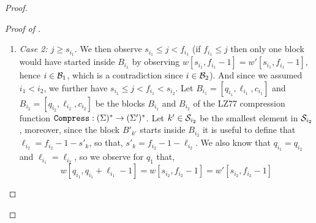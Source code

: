 \begin{proof}
\begin{proof}[Proof of ]
\begin{enumerate}
\[w[q_{i_1},q_{i_1}+\ell_{i_1}-1]=w[s_{i_1},f_{i_1}-1]=w'[s_{i_1},f_{i_1}-1],\]
and
\[w[q_{i_2},q_{i_2}+\ell_{i_2}-1]=w[s_{i_2},f_{i_2}-1]=w'[s_{i_2},f_{i_2}-1],\]

Therefore, we have that,
\[w'[s'_{k},f_{i_2}-1]=w'[s_{i_1}+(s'_{k}-s_{i_2}),f_{i_1}-1].\]

By definition of LZ77 we know that, $f'_k\geq f_{i_2}.$ Now, suppose for contradiction that $f'_k<f_{i_2}$, then $w'[s'_k,f'_{k}-1]$ is the longest substring of $w'$ starting at $s'_k$, but, $w'[s'_k,f_{i_2}-1]=w'[s_{i_1}+(s'_k-s_{i_2}),f_{i_1}-1]$
implies that $w'[s'_k,f_{i_2}-1]$ is a substring of $w'$ but $f_{i_2}-1>f'_k-1$ that is a contradiction!. Then $f'_k \geq f_{i_2}$.
    



Finally, if there is another $k' \in \S_{i_2}$ such that $k' \neq k$ then, by choice of $k$, we have $k<k'$ and therefore $s_{k'}' > f_k' \geq f_{i_2}$. This contradicts the definition of $\S_{i_2}$ since block $B_k'$ does not start inside block $B_{i_2}$. It follows that $\left| \S_{i_2}\right| \leq 1$ and therefore $i_2\in\B_1$. This is a contradiction!. Hence, we can conclude that if $i_1,i_2\in\B_2$ then $(q_{i_1},\ell_{i_1})\neq(q_{i_2},\ell_{i_2})$.

\label{case:length_cases_total:case:b}  \item \emph{Case 2: $j \geq s_{i_1}$}.
We then observe $s_{i_1} \leq j<f_{i_1}$ (if $f_{i_1}\leq j$ then only one block would have started inside $B_{i_1}$ by observing $w[s_{i_1},f_{i_1}-1]=w'[s_{i_1},f_{i_1}-1]$, hence $i\in {\ensuremath{\mathcal{B}}}_1$, which is a contradiction since $i\in{\ensuremath{\mathcal{B}}}_2$). And since we assumed $i_1<i_2$, we further have $s_{i_1} \leq j<f_{i_1}<s_{i_2}$. Let $B_{i_1}=[q_{i_1},\ell_{i_1},c_{i_1}]$ and $B_{i_2}=[q_{i_2},\ell_{i_2},c_{i_2}]$ be  the blocks $B_{i_1}$ and $B_{i_2}$ of the LZ77 compression function $\mathtt{Compress}:(\Sigma)^*\rightarrow(\Sigma')^*$. Let $k' \in \S_{i_2}$ be the smallest element in  $\S_{i_2}$, moreover, since the block $B'_{k'}$ starts inside $B_{i_2}$ it is useful to define that $\ell_{i_2}=f_{i_2}-1-s'_k$, so that, $s'_k=f_{i_2}-1-\ell_{i_2}$. We also know that $q_{i_1}=q_{i_2}$ and $\ell_{i_1}=\ell_{i_2}$, so we observe for $q_1$ that, 
\[w[q_{i_1},q_{i_1}+\ell_{i_1}-1]=w[s_{i_2},f_{i_2}-1]=w'[s_{i_2},f_{i_2}-1]\]


\end{enumerate}
\end{proof}
\end{proof}
